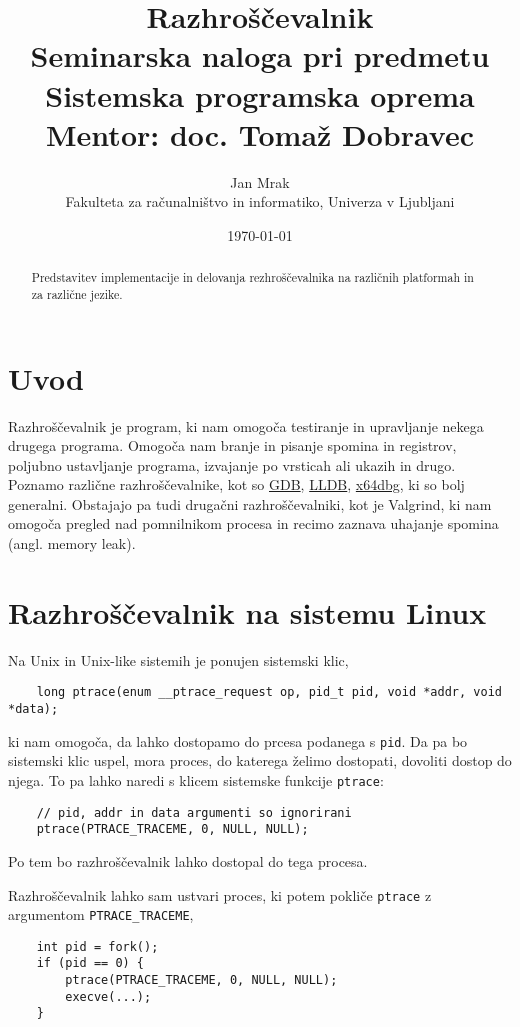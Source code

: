 \documentclass[a4paper,notitlepage]{article}
\author{Jan Mrak \\
    \small Fakulteta za računalništvo in informatiko, Univerza v Ljubljani}
\title{Razhroščevalnik\\
    \small Seminarska naloga pri predmetu Sistemska programska oprema
    \\
    \small Mentor: doc. Tomaž Dobravec}
\date{\today}
\newcommand{\code}[1]{\texttt{#1}}
\begin{document}
\maketitle
\thispagestyle{empty}

\begin{abstract}
	Predstavitev implementacije in delovanja rezhroščevalnika na različnih platformah in za različne jezike.
\end{abstract}

\section{Uvod}

Razhroščevalnik je program, ki nam omogoča testiranje in upravljanje nekega drugega programa. Omogoča nam branje in pisanje spomina in registrov, poljubno ustavljanje programa, izvajanje po vrsticah ali ukazih in drugo.
Poznamo različne razhroščevalnike, kot so \href{https://www.sourceware.org/gdb/}{GDB}, \href{https://lldb.llvm.org/}{LLDB}, \href{https://x64dbg.com/}{x64dbg}, ki so bolj generalni. Obstajajo pa tudi drugačni razhroščevalniki, kot je Valgrind, ki nam omogoča pregled nad pomnilnikom procesa in recimo zaznava uhajanje spomina (angl. memory leak).

\section{Razhroščevalnik na sistemu Linux}

Na Unix in Unix-like sistemih je ponujen sistemski klic,
\begin{verbatim}
    long ptrace(enum __ptrace_request op, pid_t pid, void *addr, void *data);    
\end{verbatim}
ki nam omogoča, da lahko dostopamo do prcesa podanega s \code{pid}. Da pa bo sistemski klic uspel, mora proces, do katerega želimo dostopati, dovoliti dostop do njega.
To pa lahko naredi s klicem sistemske funkcije \code{ptrace}:
\begin{verbatim}
    // pid, addr in data argumenti so ignorirani
    ptrace(PTRACE_TRACEME, 0, NULL, NULL);
\end{verbatim}

Po tem bo razhroščevalnik lahko dostopal do tega procesa.

Razhroščevalnik lahko sam ustvari proces, ki potem pokliče \code{ptrace} z argumentom \code{PTRACE_TRACEME},

\begin{verbatim}
    int pid = fork();
    if (pid == 0) {
        ptrace(PTRACE_TRACEME, 0, NULL, NULL);
        execve(...);
    }
\end{verbatim}
\end{document}
